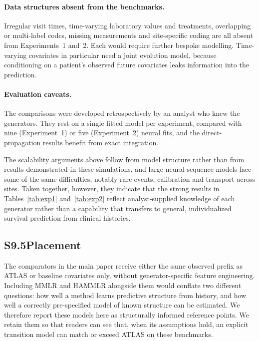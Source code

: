 \documentclass[11pt]{article}
\begin{document}
\paragraph{Data structures absent from the benchmarks.} Irregular visit times, time-varying laboratory values and treatments, overlapping or multi-label codes, missing measurements and site-specific coding are all absent from Experiments~1 and~2. Each would require further bespoke modelling. Time-varying covariates in particular need a joint evolution model, because conditioning on a patient's observed future covariates leaks information into the prediction.

\paragraph{Evaluation caveats.} The comparisons were developed retrospectively by an analyst who knew the generators. They rest on a single fitted model per experiment, compared with nine (Experiment~1) or five (Experiment~2) neural fits, and the direct-propagation results benefit from exact integration.

\medskip
The scalability arguments above follow from model structure rather than from results demonstrated in these simulations, and large neural sequence models face some of the same difficulties, notably rare events, calibration and transport across sites. Taken together, however, they indicate that the strong results in Tables~\ref{tab:exp1} and~\ref{tab:exp2} reflect analyst-supplied knowledge of each generator rather than a capability that transfers to general, individualized survival prediction from clinical histories.

\subsection*{S9.5\quad Placement}

The comparators in the main paper receive either the same observed prefix as ATLAS or baseline covariates only, without generator-specific feature engineering. Including MMLR and HAMMLR alongside them would conflate two different questions: how well a method learns predictive structure from history, and how well a correctly pre-specified model of known structure can be estimated. We therefore report these models here as structurally informed reference points. We retain them so that readers can see that, when its assumptions hold, an explicit transition model can match or exceed ATLAS on these benchmarks.
\end{document}

